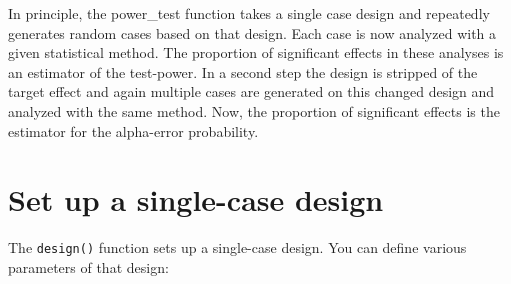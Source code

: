 \documentclass[
]{book}
\begin{document}
In principle, the power\_test function takes a single case design and repeatedly generates random cases based on that design. Each case is now analyzed with a given statistical method. The proportion of significant effects in these analyses is an estimator of the test-power. In a second step the design is stripped of the target effect and again multiple cases are generated on this changed design and analyzed with the same method. Now, the proportion of significant effects is the estimator for the alpha-error probability.

\hypertarget{set-up-a-single-case-design}{%
\section{Set up a single-case design}\label{set-up-a-single-case-design}}

The \texttt{design()} function sets up a single-case design. You can define various parameters of that design:
\end{document}
